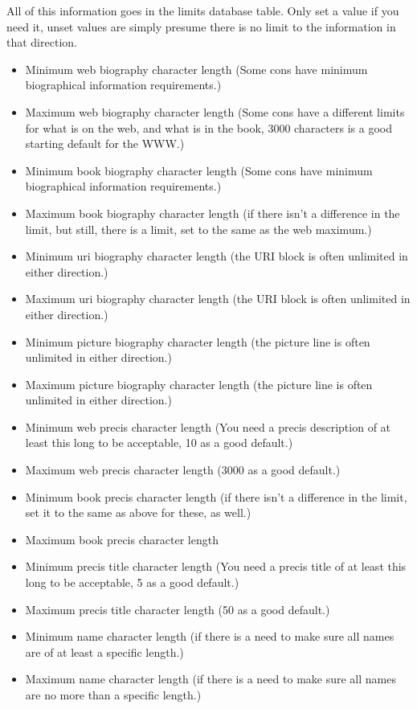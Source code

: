 \documentclass[captions=tablesignature]{scrartcl}
\begin{document}
All of this information goes in the limits database table.  Only
set a value if you need it, unset values are simply presume there
is no limit to the information in that direction.
\begin{itemize}
\item Minimum web biography character length (Some cons have minimum
biographical information requirements.)
\item Maximum web biography character length (Some cons have a
different limits for what is on the web, and what is in the
book, 3000 characters is a good starting default for the WWW.)
\item Minimum book biography character length (Some cons have minimum
biographical information requirements.)
\item Maximum book biography character length (if there isn't a
difference in the limit, but still, there is a limit, set to
the same as the web maximum.)
\item Minimum uri biography character length (the URI block is often
unlimited in either direction.)
\item Maximum uri biography character length (the URI block is often
unlimited in either direction.)
\item Minimum picture biography character length (the picture line is
often unlimited in either direction.)
\item Maximum picture biography character length (the picture line is
often unlimited in either direction.)
\item Minimum web precis character length (You need a precis
description of at least this long to be acceptable, 10 as a
good default.)
\item Maximum web precis character length (3000 as a good default.)
\item Minimum book precis character length (if there isn't a
difference in the limit, set it to the same as above for these,
as well.)
\item Maximum book precis character length
\item Minimum precis title character length (You need a precis title
of at least this long to be acceptable, 5 as a good default.)
\item Maximum precis title character length (50 as a good default.)
\item Minimum name character length (if there is a need to make sure
all names are of at least a specific length.)
\item Maximum name character length (if there is a need to make sure
all names are no more than a specific length.)
\end{itemize}
\end{document}
